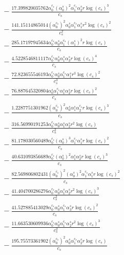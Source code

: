 \documentclass[10pt]{article}
\begin{document}
\begin{align*}
&{}  - \frac{17.399820035762 \alpha_{0}^{c_s} \left(\alpha_{0}^s\right)^{2} \alpha_{1}^{c_s} \alpha_{2}^s r \log{\left(c_{s} \right)}^{3}}{c_{s}} \\
&{}  - \frac{141.15114865014 \left(\alpha_{0}^{c_s}\right)^{2} \alpha_{0}^s \alpha_{1}^{c_s} \alpha_{1}^s r^{2} \log{\left(c_{s} \right)}^{2}}{c_{s}^{2}} \\
&{}  - \frac{285.17197945634 \alpha_{0}^{c_s} \alpha_{0}^s \alpha_{1}^{c_s} \left(\alpha_{1}^s\right)^{2} r \log{\left(c_{s} \right)}}{c_{s}} \\
&{}  - \frac{4.5228546811117 \alpha_{0}^{c_s} \alpha_{0}^s \alpha_{1}^s \alpha_{3}^s r \log{\left(c_{s} \right)}^{4}}{c_{s}} \\
&{}  - \frac{72.823655546193 \alpha_{0}^{c_s} \alpha_{0}^s \alpha_{1}^{c_s} \alpha_{1}^s r^{3} \log{\left(c_{s} \right)}^{2}}{c_{s}^{3}} \\
&{}  - \frac{76.887645320804 \alpha_{0}^s \alpha_{1}^{c_s} \alpha_{1}^s \alpha_{2}^s r \log{\left(c_{s} \right)}^{2}}{c_{s}} \\
&{}  - \frac{1.2287751301962 \left(\alpha_{0}^{c_s}\right)^{2} \alpha_{0}^s \alpha_{1}^s \alpha_{2}^{c_s} r \log{\left(c_{s} \right)}^{3}}{c_{s}} \\
&{}  - \frac{316.56990191253 \alpha_{0}^{c_s} \alpha_{0}^s \alpha_{1}^s \alpha_{2}^s r^{2} \log{\left(c_{s} \right)}}{c_{s}^{2}} \\
&{}  - \frac{81.178030560489 \alpha_{0}^{c_s} \left(\alpha_{0}^s\right)^{3} \alpha_{1}^{c_s} \alpha_{1}^s r \log{\left(c_{s} \right)}^{2}}{c_{s}} \\
&{}  - \frac{40.631093856689 \alpha_{0}^{c_s} \left(\alpha_{0}^s\right)^{2} \alpha_{1}^s \alpha_{2}^s r \log{\left(c_{s} \right)}^{3}}{c_{s}} \\
&{}  - \frac{82.569806802431 \left(\alpha_{0}^{c_s}\right)^{2} \left(\alpha_{0}^s\right)^{2} \alpha_{1}^{c_s} \alpha_{1}^s r \log{\left(c_{s} \right)}^{2}}{c_{s}} \\
&{}  - \frac{41.404700286276 \alpha_{0}^{c_s} \alpha_{0}^s \alpha_{1}^s \alpha_{2}^s r^{2} \log{\left(c_{s} \right)}^{3}}{c_{s}^{2}} \\
&{}  - \frac{41.527885413029 \alpha_{0}^{c_s} \alpha_{0}^s \alpha_{1}^{c_s} \alpha_{3}^s r \log{\left(c_{s} \right)}^{2}}{c_{s}} \\
&{}  - \frac{11.663530609936 \alpha_{0}^{c_s} \alpha_{0}^s \alpha_{1}^{c_s} \alpha_{2}^s r^{2} \log{\left(c_{s} \right)}^{3}}{c_{s}^{2}} \\
&{}  - \frac{195.75573361902 \left(\alpha_{0}^{c_s}\right)^{2} \alpha_{0}^s \alpha_{1}^{c_s} \alpha_{2}^s r \log{\left(c_{s} \right)}}{c_{s}} \\

\end{align*}
\end{document}
